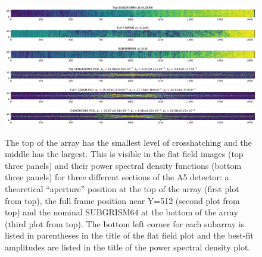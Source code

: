 \documentclass[]{aastex62}
\begin{document}
\begin{figure}[!hbtp]
\centering
\includegraphics[width=0.99\columnwidth]{subg_pos_topGrism64.pdf}\\
\includegraphics[width=0.99\columnwidth]{subg_pos_fullfGrismRegion.pdf}\\
\includegraphics[width=0.99\columnwidth]{subg_pos_subgrism64.pdf}\\
\vspace{0.2in}
\includegraphics[width=0.99\columnwidth]{subg_pos_topGrism64_psd.pdf}\\
\includegraphics[width=0.99\columnwidth]{subg_pos_fullfGrismRegion_psd.pdf}\\
\includegraphics[width=0.99\columnwidth]{subg_pos_subgrism64_psd.pdf}\\
\caption{
The top of the array has the smallest level of crosshatching and the middle has the largest.
This is visible in the flat field images (top three panels) and their power spectral density functions (bottom three panels) for three different sections of the A5 detector: a theoretical ``aperture'' position at the top of the array (first plot from top), the full frame position near Y=512 (second plot from top) and the nominal SUBGRISM64 at the bottom of the array (third plot from top).
The bottom left corner for each subarray is listed in parentheses in the title of the flat field plot and the best-fit amplitudes are listed in the title of the power spectral density plot.
 }\label{fig:crosshatchGrismPos}
\end{figure}
\end{document}
